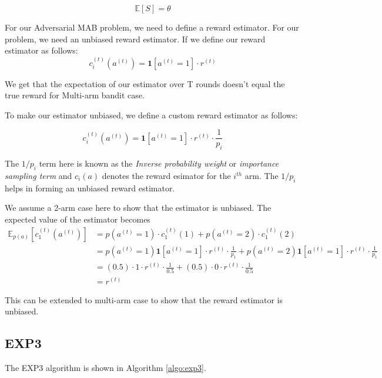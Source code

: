 \documentclass[11pt]{article}
\begin{document}
\begin{equation}
    \mathbb{E}[S]=\theta
\end{equation}

For our Adversarial MAB problem, we need to define a reward estimator. For our problem, we need an unbiased reward estimator. If we define our reward estimator as follows:
\begin{equation}
     c_i^{(t)}(a^{(t)}) = \mathbf{1}[a^{(t)}=1] \cdot r^{(t)}
\end{equation}

We get that the expectation of our estimator over T rounds doesn't equal the true reward for Multi-arm bandit case.

To make our estimator unbiased, we define a custom reward estimator as follows:

\begin{equation}
     c_i^{(t)}(a^{(t)}) = \mathbf{1}[a^{(t)}=1] \cdot r^{(t)} \cdot \frac{1}{p_i}
\end{equation}

The $1/p_i$ term here is known as the \textit{Inverse probability weight} or \textit{importance sampling term} and $c_i(a)$ denotes the reward esimator for the $i^{th}$ arm. The $1/p_i$ helps in forming an unbiased reward estimator.

We assume a 2-arm case here to show  that the estimator is unbiased. The expected value of the estimator becomes
\begin{align} \mathbb{E}_{p(a)}\left[c_{1}^{(t)}\left(a^{(t)}\right)\right] &=p\left(a^{(t)}=1\right) \cdot c_{1}^{(t)}(1)+p\left(a^{(t)}=2\right) \cdot c_{1}^{(t)}(2) \\ &=p\left(a^{(t)}=1\right) \mathbf{1}\left[a^{(t)}=1\right] \cdot r^{(t)} \cdot \frac{1}{p_{1}}+p\left(a^{(t)}=2\right) \mathbf{1}\left[a^{(t)}=1\right] \cdot r^{(t)} \cdot \frac{1}{p_{1}} \\ &=(0.5) \cdot 1 \cdot r^{(t)} \cdot \frac{1}{0.5}+(0.5) \cdot 0 \cdot r^{(t)} \cdot \frac{1}{0.5} \\ &=r^{(t)}
\end{align}

This can be extended to multi-arm case to show that the reward estimator is unbiased.

\subsection{EXP3}
\label{sec:exp3}

The EXP3 algorithm is shown in Algorithm \ref{algo:exp3}. 
\end{document}

